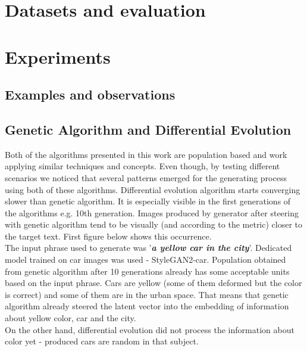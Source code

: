 \documentclass[12pt,a4paper,openany]{book}
\begin{document}
\chapter{Datasets and evaluation}
\chapter{Experiments}

\section{Examples and observations}

\section{Genetic Algorithm and Differential Evolution}

Both of the algorithms presented in this work are population based and work applying similar techniques and concepts. Even though, by testing different scenarios we noticed that several patterns emerged for the generating process using both of these algorithms. 
Differential evolution algorithm starts converging slower than genetic algorithm. It is especially visible in the first generations of the algorithms e.g. 10th generation. Images produced by generator after steering with genetic algorithm tend to be visually (and according to the metric) closer to the target text. First figure below shows this occurrence.\\
The input phrase used to generate was '\textit{\textbf{a yellow car in the city}}'. Dedicated model trained on car images was used - StyleGAN2-car. Population obtained from genetic algorithm after 10 generations already has some acceptable units based on the input phrase. Cars are yellow (some of them deformed but the color is correct) and some of them are in the urban space. That means that genetic algorithm already steered the latent vector into the embedding of information about yellow color, car and the city.\\
On the other hand, differential evolution did not process the information about color yet - produced cars are random in that subject.

\newpage
\end{document}
